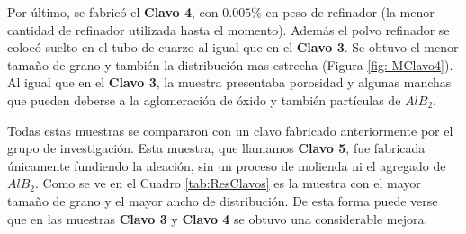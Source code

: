 \documentclass[a4paper,12pt,fleqn,twoside,openany]{book}
\begin{document}
Por último, se fabricó el  \textbf{Clavo 4}, con $0.005 \%$ en peso de refinador (la menor cantidad de refinador utilizada hasta el momento). Además el polvo refinador se colocó suelto en el tubo de cuarzo al igual que en el \textbf{Clavo 3}. Se obtuvo el menor tamaño de grano y también la distribución mas estrecha (Figura \ref{fig: MClavo4}). Al igual que en el \textbf{Clavo 3}, la muestra presentaba porosidad y algunas manchas que pueden deberse a la aglomeración de óxido y también partículas de $AlB_2$.
 


Todas estas muestras se compararon con un clavo fabricado anteriormente por el grupo de investigación. Esta muestra, que llamamos \textbf{Clavo 5}, fue fabricada únicamente fundiendo la aleación, sin un proceso de molienda ni el agregado de $AlB_2$. Como se ve en el Cuadro \ref{tab:ResClavos} es la muestra con el mayor tamaño de grano y el mayor ancho de distribución. De esta forma puede verse que en las muestras \textbf{Clavo 3} y \textbf{Clavo 4} se obtuvo una considerable mejora.   
\end{document}
